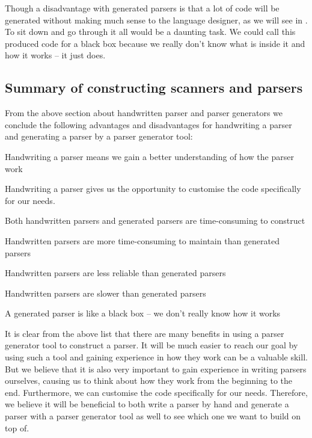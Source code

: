 Though a disadvantage with generated parsers is that a lot of code will be
generated without making much sense to the language designer, as we will see in
. To sit down and go through it all would be a
daunting task. We could call this produced code for a black box because we
really don't know what is inside it and how it works -- it just does.

\subsection{Summary of constructing scanners and parsers}
\label{subsec:summary-parser}
From the above section about handwritten parser and parser generators we
conclude the following advantages and disadvantages for handwriting a parser and
generating a parser by a parser generator tool:

\begin{dlist}
  \item Handwriting a parser means we gain a better understanding of how the
    parser work
  \item Handwriting a parser gives us the opportunity to customise the code
    specifically for our needs.
  \item Both handwritten parsers and generated parsers are time-consuming to
    construct
  \item Handwritten parsers are more time-consuming to maintain than generated
    parsers
  \item Handwritten parsers are less reliable than generated parsers
  \item Handwritten parsers are slower than generated parsers
  \item A generated parser is like a black box -- we don't really know how it
    works
\end{dlist}

It is clear from the above list that there are many benefits in using a parser
generator tool to construct a parser. It will be much easier to reach our goal
by using such a tool and gaining experience in how they work can be a valuable
skill. But we believe that it is also very important to gain experience in
writing parsers ourselves, causing us to think about how they work from the
beginning to the end. Furthermore, we can customise the code specifically for
our needs. Therefore, we believe it will be beneficial to both write a parser by
hand and generate a parser with a parser generator tool as well to see which one
we want to build on top of.
